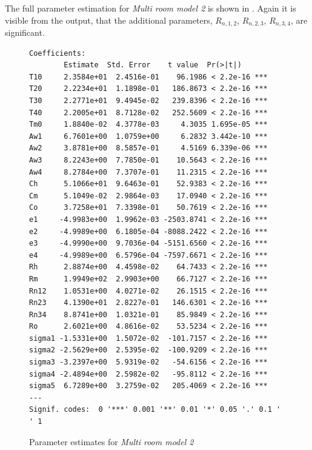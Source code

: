 \documentclass[a4paper]{article}
\begin{document}
The full parameter estimation for \emph{Multi room model 2} is shown in . Again it is visible from the output, that the additional parameters, $R_{n,1,2}$, $R_{n,2,3}$, $R_{n,3,4}$, are significant.

\begin{figure}
\begin{lstlisting}[basicstyle=\footnotesize\ttfamily,frame=single,breaklines=true]
Coefficients:
        Estimate  Std. Error    t value  Pr(>|t|)
T10     2.3584e+01  2.4516e-01    96.1986 < 2.2e-16 ***
T20     2.2234e+01  1.1898e-01   186.8673 < 2.2e-16 ***
T30     2.2771e+01  9.4945e-02   239.8396 < 2.2e-16 ***
T40     2.2005e+01  8.7128e-02   252.5609 < 2.2e-16 ***
Tm0     1.8840e-02  4.3778e-03     4.3035 1.695e-05 ***
Aw1     6.7601e+00  1.0759e+00     6.2832 3.442e-10 ***
Aw2     3.8781e+00  8.5857e-01     4.5169 6.339e-06 ***
Aw3     8.2243e+00  7.7850e-01    10.5643 < 2.2e-16 ***
Aw4     8.2784e+00  7.3707e-01    11.2315 < 2.2e-16 ***
Ch      5.1066e+01  9.6463e-01    52.9383 < 2.2e-16 ***
Cm      5.1049e-02  2.9864e-03    17.0940 < 2.2e-16 ***
Co      3.7258e+01  7.3398e-01    50.7619 < 2.2e-16 ***
e1     -4.9983e+00  1.9962e-03 -2503.8741 < 2.2e-16 ***
e2     -4.9989e+00  6.1805e-04 -8088.2422 < 2.2e-16 ***
e3     -4.9990e+00  9.7036e-04 -5151.6560 < 2.2e-16 ***
e4     -4.9989e+00  6.5796e-04 -7597.6671 < 2.2e-16 ***
Rh      2.8874e+00  4.4598e-02    64.7433 < 2.2e-16 ***
Rm      1.9949e+02  2.9903e+00    66.7127 < 2.2e-16 ***
Rn12    1.0531e+00  4.0271e-02    26.1515 < 2.2e-16 ***
Rn23    4.1390e+01  2.8227e-01   146.6301 < 2.2e-16 ***
Rn34    8.8741e+00  1.0321e-01    85.9849 < 2.2e-16 ***
Ro      2.6021e+00  4.8616e-02    53.5234 < 2.2e-16 ***
sigma1 -1.5331e+00  1.5072e-02  -101.7157 < 2.2e-16 ***
sigma2 -2.5629e+00  2.5395e-02  -100.9209 < 2.2e-16 ***
sigma3 -3.2397e+00  5.9319e-02   -54.6156 < 2.2e-16 ***
sigma4 -2.4894e+00  2.5982e-02   -95.8112 < 2.2e-16 ***
sigma5  6.7289e+00  3.2759e-02   205.4069 < 2.2e-16 ***
---
Signif. codes:  0 '***' 0.001 '**' 0.01 '*' 0.05 '.' 0.1 ' ' 1
\end{lstlisting}
\caption{Parameter estimates for \emph{Multi room model 2}}
\label{fig:part2c}
\end{figure}
\end{document}
